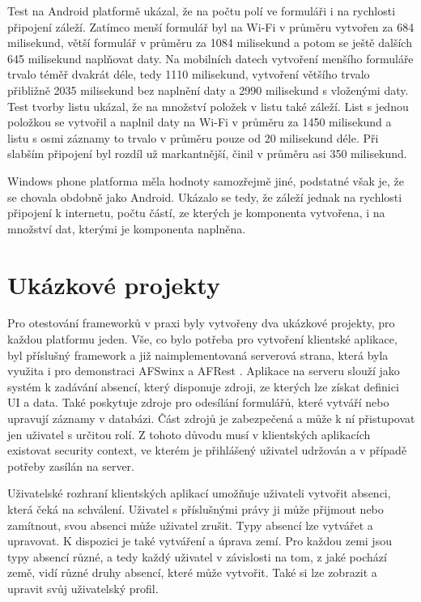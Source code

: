Test na Android platformě ukázal, že na počtu polí ve formuláři i na rychlosti připojení záleží. Zatímco menší formulář byl na Wi-Fi v průměru vytvořen za 684 milisekund, větší formulář v průměru za 1084 milisekund a potom se ještě dalších 645 milisekund naplňovat daty. Na mobilních datech vytvoření menšího formuláře trvalo téměř dvakrát déle, tedy 1110 milisekund, vytvoření většího trvalo přibližně 2035 milisekund bez naplnění daty a 2990 milisekund s vloženými daty. Test tvorby listu ukázal, že na množství položek v listu také záleží. List s jednou položkou se vytvořil a naplnil daty na Wi-Fi v průměru za 1450 milisekund a listu s osmi záznamy to trvalo v průměru pouze od 20 milisekund déle. Při slabším připojení byl rozdíl už markantnější, činil v průměru asi 350 milisekund.

Windows phone platforma měla hodnoty samozřejmě jiné, podstatné však je, že se chovala obdobně jako Android. Ukázalo se tedy, že záleží jednak na rychlosti připojení k internetu, počtu částí, ze kterých je komponenta vytvořena, i na množství dat, kterými je komponenta naplněna.

\section{Ukázkové projekty}
Pro otestování frameworků v praxi byly vytvořeny dva ukázkové projekty, pro každou platformu jeden. Vše, co bylo potřeba pro vytvoření klientské aplikace, byl příslušný framework a již naimplementovaná serverová strana, která byla využita i pro demonstraci AFSwinx a AFRest \cite{tomasek-thesis}. Aplikace na serveru slouží jako systém k zadávání absencí, který disponuje zdroji, ze kterých lze získat definici UI a data. Také poskytuje zdroje pro odesílání formulářů, které vytváří nebo upravují záznamy v databázi. Část zdrojů je zabezpečená a může k ní přistupovat jen uživatel s určitou rolí. Z tohoto důvodu musí v klientských aplikacích existovat security context, ve kterém je přihlášený uživatel udržován a v případě potřeby zasílán na server. 

Uživatelské rozhraní klientských aplikací umožňuje uživateli vytvořit absenci, která čeká na schválení. Uživatel s příslušnými právy ji může přijmout nebo zamítnout, svou absenci může uživatel zrušit. Typy absencí lze vytvářet a upravovat. K dispozici je také vytváření a úprava zemí. Pro každou zemi jsou typy absencí různé, a tedy každý uživatel v závislosti na tom, z jaké pochází země, vidí různé druhy absencí, které může vytvořit. Také si lze zobrazit a upravit svůj uživatelský profil.

